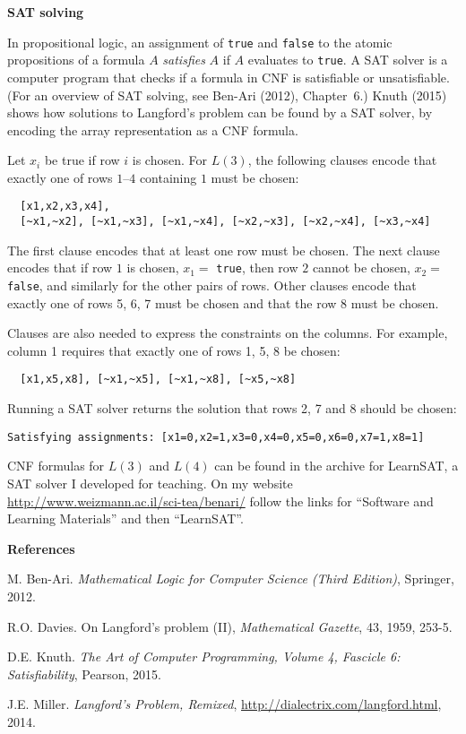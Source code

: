 \documentclass[11pt,a4paper]{report}
\begin{document}
\begin{center}
\textbf{\Large SAT solving}
\end{center}

In propositional logic, an assignment of \texttt{true} and \texttt{false} to the atomic propositions of a formula $A$ \emph{satisfies} $A$ if $A$ evaluates to \texttt{true}. A SAT solver is a computer program that checks if a formula in CNF is satisfiable or unsatisfiable. (For an overview of SAT solving, see Ben-Ari (2012), Chapter~6.) Knuth (2015) shows how solutions to Langford's problem can be found by a SAT solver, by encoding the array representation as a CNF formula.

Let $x_i$ be true if row $i$ is chosen. For $L(3)$, the following clauses encode that exactly one of rows $1$--$4$ containing $1$ must be chosen:
\begin{verbatim}
  [x1,x2,x3,x4],
  [~x1,~x2], [~x1,~x3], [~x1,~x4], [~x2,~x3], [~x2,~x4], [~x3,~x4]
\end{verbatim}
The first clause encodes that at least one row must be chosen. The next clause encodes that if row $1$ is chosen, $x_1=$ \texttt{true}, then row $2$ cannot be chosen, $x_2=$ \texttt{false}, and similarly for the other pairs of rows. Other clauses encode that exactly one of rows 5, 6, 7 must be chosen and that the row 8 must be chosen.

Clauses are also needed to express the constraints on the columns. For example, column 1 requires that exactly one of rows 1, 5, 8 be chosen:
\begin{verbatim}
  [x1,x5,x8], [~x1,~x5], [~x1,~x8], [~x5,~x8]
\end{verbatim}

Running a SAT solver returns the solution that rows 2, 7 and 8 should be chosen:
\begin{verbatim}
Satisfying assignments: [x1=0,x2=1,x3=0,x4=0,x5=0,x6=0,x7=1,x8=1]
\end{verbatim}

\bigskip

CNF formulas for $L(3)$ and $L(4)$ can be found in the archive for LearnSAT, a SAT solver I developed for teaching. On my website
\url{http://www.weizmann.ac.il/sci-tea/benari/} follow the links for ``Software and Learning Materials'' and then ``LearnSAT''.



\bigskip

\textbf{\Large References}

\begin{small}
M. Ben-Ari. \textit{Mathematical Logic for Computer Science (Third Edition)}, Springer, 2012.

R.O. Davies. On Langford's problem (II), \textit{Mathematical Gazette}, 43, 1959, 253-5.

D.E. Knuth. \textit{The Art of Computer Programming, Volume 4, Fascicle 6: Satisfiability}, Pearson, 2015.

J.E. Miller. \textit{Langford's Problem, Remixed}, \url{http://dialectrix.com/langford.html}, 2014.

\end{small}
\end{document}
